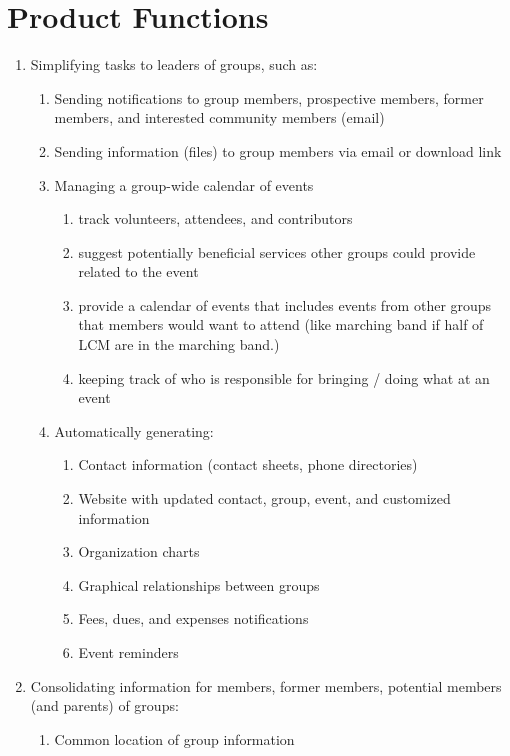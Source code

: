 	\section{Product Functions}
		\begin{enumerate}
		\item Simplifying tasks to leaders of groups, such as:
			\begin{enumerate}
				\item Sending notifications to group members, prospective
					members, former members, and interested community
					members (email)
				\item Sending information (files) to group members via
					email or download link
				\item Managing a group-wide calendar of events
				\begin{enumerate}
					\item track volunteers, attendees, and contributors
					\item suggest potentially beneficial services other
						groups could provide related to the event
					\item provide a calendar of events that includes events
						from other groups that members would want to attend
						(like marching band if half of LCM are in the
						marching	band.)
					\item keeping track of who is responsible for bringing
						/ doing what at an event
				\end{enumerate}
				\item Automatically generating:
				\begin{enumerate}
					\item Contact information (contact sheets, phone
						directories)
					\item Website with updated contact, group, event, and
						customized information
					\item Organization charts
					\item Graphical relationships between groups
					\item Fees, dues, and expenses notifications
					\item Event reminders
				\end{enumerate}
			\end{enumerate}
			\item Consolidating information for members, former members,
				potential members (and parents) of groups:
			\begin{enumerate}
				\item Common location of group information

\end{enumerate}
\end{enumerate}
